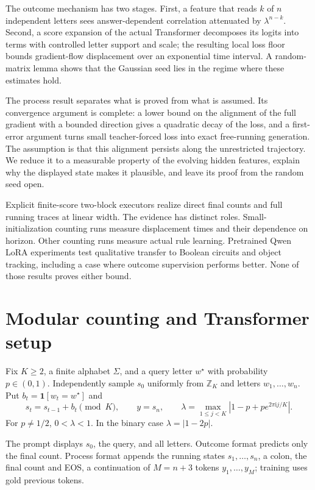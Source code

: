 The outcome mechanism has two stages. First, a feature that reads $k$ of $n$ independent letters sees answer-dependent correlation attenuated by $\lambda^{n-k}$. Second, a score expansion of the actual Transformer decomposes its logits into terms with controlled letter support and scale; the resulting local loss floor bounds gradient-flow displacement over an exponential time interval. A random-matrix lemma shows that the Gaussian seed lies in the regime where these estimates hold.

The process result separates what is proved from what is assumed. Its convergence argument is complete: a lower bound on the alignment of the full gradient with a bounded direction gives a quadratic decay of the loss, and a first-error argument turns small teacher-forced loss into exact free-running generation. The assumption is that this alignment persists along the unrestricted trajectory. We reduce it to a measurable property of the evolving hidden features, explain why the displayed state makes it plausible, and leave its proof from the random seed open.

Explicit finite-score two-block executors realize direct final counts and full running traces at linear width. The evidence has distinct roles. Small-initialization counting runs measure displacement times and their dependence on horizon. Other counting runs measure actual rule learning. Pretrained Qwen LoRA experiments test qualitative transfer to Boolean circuits and object tracking, including a case where outcome supervision performs better. None of those results proves either bound.

\section{Modular counting and Transformer setup}\label{sec:setup}\label{sec:setting}
\begin{definition}\label{def:task}\label{def:lambda}
Fix $K\ge2$, a finite alphabet $\Sigma$, and a query letter $w^\star$ with probability $p\in(0,1)$. Independently sample $s_0$ uniformly from $\mathbb Z_K$ and letters $w_1,\ldots,w_n$. Put $b_t=\mathbf1[w_t=w^\star]$ and
\begin{equation}
s_t=s_{t-1}+b_t\pmod K,\qquad y=s_n,\qquad
\lambda=\max_{1\le j<K}|1-p+p e^{2\pi\mathrm i j/K}|.
\label{eq:lambda}
\end{equation}
For $p\ne1/2$, $0<\lambda<1$. In the binary case $\lambda=|1-2p|$.
\end{definition}
The prompt displays $s_0$, the query, and all letters. Outcome format predicts only the final count. Process format appends the running states $s_1,\ldots,s_n$, a colon, the final count and EOS, a continuation of $M=n+3$ tokens $y_1,\ldots,y_M$; training uses gold previous tokens.

